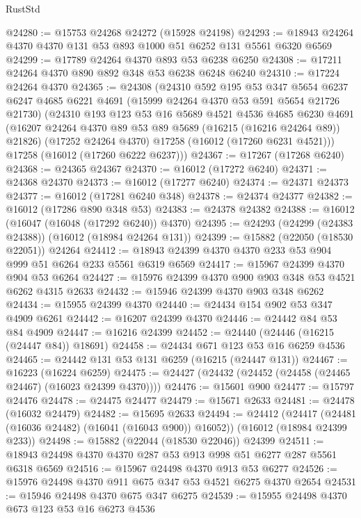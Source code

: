\begin{lexlean}{RustStd}
\begin{coremodule}
@24280 := @15753 @24268 @24272 (@15928 @24198)
@24293 := @18943 @24264 @4370 @4370 @131 @53 @893 @1000 @51 @6252 @131 @5561 @6320 @6569
@24299 := @17789 @24264 @4370 @893 @53 @6238 @6250
@24308 := @17211 @24264 @4370 @890 @892 @348 @53 @6238 @6248 @6240
@24310 := @17224 @24264 @4370
@24365 := @24308
    (@24310
      @592
      @195
      @53
      @347
      @5654
      @6237
      @6247
      @4685
      @6221
      @4691
      (@15999 @24264 @4370 @53 @591 @5654 @21726 @21730)
      (@24310
        @193
        @123
        @53
        @16
        @5689
        @4521
        @4536
        @4685
        @6230
        @4691
        (@16207 @24264 @4370 @89 @53 @89 @5689 (@16215 (@16216 @24264 @89)) @21826)
        (@17252 @24264 @4370)
        @17258
        (@16012 (@17260 @6231 @4521)))
      @17258
      (@16012 (@17260 @6222 @6237)))
@24367 := @17267 (@17268 @6240)
@24368 := @24365 @24367
@24370 := @16012 (@17272 @6240)
@24371 := @24368 @24370
@24373 := @16012 (@17277 @6240)
@24374 := @24371 @24373
@24377 := @16012 (@17281 @6240 @348)
@24378 := @24374 @24377
@24382 := @16012 (@17286 @890 @348 @53)
@24383 := @24378 @24382
@24388 := @16012 (@16047 (@16048 (@17292 @6240)) @4370)
@24395 := @24293 (@24299 (@24383 @24388)) (@16012 (@18984 @24264 @131))
@24399 := @15882 (@22050 (@18530 @22051)) @24264
@24412 := @18943 @24399 @4370 @4370 @233 @53 @904 @999 @51 @6264 @233 @5561 @6319 @6569
@24417 := @15967 @24399 @4370 @904 @53 @6264
@24427 := @15976 @24399 @4370 @900 @903 @348 @53 @4521 @6262 @4315 @2633
@24432 := @15946 @24399 @4370 @903 @348 @6262
@24434 := @15955 @24399 @4370
@24440 := @24434 @154 @902 @53 @347 @4909 @6261
@24442 := @16207 @24399 @4370
@24446 := @24442 @84 @53 @84 @4909
@24447 := @16216 @24399
@24452 := @24440 (@24446 (@16215 (@24447 @84)) @18691)
@24458 := @24434 @671 @123 @53 @16 @6259 @4536
@24465 := @24442 @131 @53 @131 @6259 (@16215 (@24447 @131))
@24467 := @16223 (@16224 @6259)
@24475 := @24427 (@24432 (@24452 (@24458 (@24465 @24467) (@16023 @24399 @4370))))
@24476 := @15601 @900
@24477 := @15797 @24476
@24478 := @24475 @24477
@24479 := @15671 @2633
@24481 := @24478 (@16032 @24479)
@24482 := @15695 @2633
@24494 := @24412
    (@24417 (@24481 (@16036 @24482) (@16041 (@16043 @900)) @16052))
    (@16012 (@18984 @24399 @233))
@24498 := @15882 (@22044 (@18530 @22046)) @24399
@24511 := @18943 @24498 @4370 @4370 @287 @53 @913 @998 @51 @6277 @287 @5561 @6318 @6569
@24516 := @15967 @24498 @4370 @913 @53 @6277
@24526 := @15976 @24498 @4370 @911 @675 @347 @53 @4521 @6275 @4370 @2654
@24531 := @15946 @24498 @4370 @675 @347 @6275
@24539 := @15955 @24498 @4370 @673 @123 @53 @16 @6273 @4536

\end{coremodule}
\end{lexlean}
